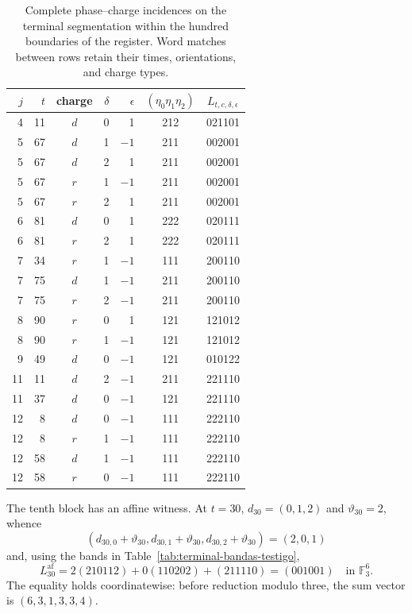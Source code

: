 \begin{table}[htbp]
\centering\small
\begin{tabular}{rrcrrc c}
\toprule
$j$&$t$&charge&$\delta$&$\epsilon$&$(\eta_0\eta_1\eta_2)$&$L_{t,c,\delta,\epsilon}$\\
\midrule
4&11&$d$&0& 1&212&021101\\
5&67&$d$&1&$-1$&211&002001\\
5&67&$d$&2& 1&211&002001\\
5&67&$r$&1&$-1$&211&002001\\
5&67&$r$&2& 1&211&002001\\
6&81&$d$&0& 1&222&020111\\
6&81&$r$&2& 1&222&020111\\
7&34&$r$&1&$-1$&111&200110\\
7&75&$d$&1&$-1$&211&200110\\
7&75&$r$&2&$-1$&211&200110\\
8&90&$r$&0& 1&121&121012\\
8&90&$r$&1&$-1$&121&121012\\
9&49&$d$&0&$-1$&121&010122\\
11&11&$d$&2&$-1$&211&221110\\
11&37&$d$&0&$-1$&121&221110\\
12&8&$d$&0&$-1$&111&222110\\
12&8&$r$&1&$-1$&111&222110\\
12&58&$d$&1&$-1$&111&222110\\
12&58&$r$&0&$-1$&111&222110\\
\bottomrule
\end{tabular}
\caption{Complete phase--charge incidences on the terminal segmentation
within the hundred boundaries of the register. Word matches between
rows retain their times, orientations, and charge types.}
\label{tab:terminal-incidencias-completas}
\end{table}

The tenth block has an affine witness. At $t=30$,
$d_{30}=(0,1,2)$ and $\vartheta_{30}=2$, whence
\[
 (d_{30,0}+\vartheta_{30},d_{30,1}+\vartheta_{30},
 d_{30,2}+\vartheta_{30})=(2,0,1)
\]
and, using the bands in Table~\ref{tab:terminal-bandas-testigo},
\[
 L^{\mathrm{af}}_{30}
 =2(210112)+0(110202)+(211110)
 =(001001)\quad\text{in }\mathbb F_3^6.
\]
The equality holds coordinatewise: before reduction modulo three,
the sum vector is $(6,3,1,3,3,4)$.

